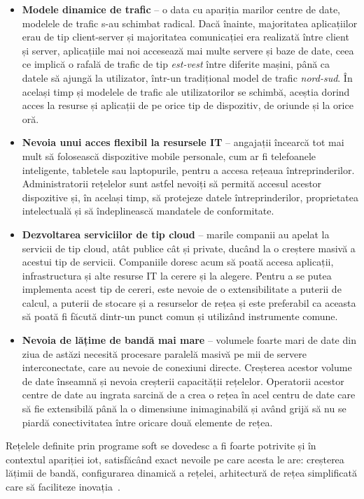 \begin{itemize}
	\item \textbf{Modele dinamice de trafic} – o data cu apariția marilor centre de date, modelele de trafic s-au schimbat radical. Dacă înainte, majoritatea aplicațiilor erau de tip client-server și majoritatea comunicației era realizată între client și server, aplicațiile mai noi accesează mai multe servere și baze de date, ceea ce implică o rafală de trafic de tip \textit{est-vest} între diferite mașini, până ca datele să ajungă la utilizator, într-un tradițional model de trafic \textit{nord-sud}. În același timp și modelele de trafic ale utilizatorilor se schimbă, aceștia dorind acces la resurse și aplicații de pe orice tip de dispozitiv, de oriunde și la orice oră.
	\item \textbf{Nevoia unui acces flexibil la resursele IT} – angajații încearcă tot mai mult să folosească dispozitive mobile personale, cum ar fi telefoanele inteligente, tabletele sau laptopurile, pentru a accesa rețeaua întreprinderilor. Administratorii rețelelor sunt astfel nevoiți să permită accesul acestor dispozitive și, în același timp, să protejeze datele întreprinderilor, proprietatea intelectuală și să îndeplinească mandatele de conformitate.
	\item \textbf{Dezvoltarea serviciilor de tip cloud} – marile companii au apelat la servicii de tip cloud, atât publice cât și private, ducând la o creștere masivă a acestui tip de servicii. Companiile doresc acum să poată accesa aplicații, infrastructura și alte resurse IT la cerere și la alegere. Pentru a se putea implementa acest tip de cereri, este nevoie de o extensibilitate a puterii de calcul, a puterii de stocare și a resurselor de rețea și este preferabil ca aceasta să poată fi făcută dintr-un punct comun și utilizând instrumente comune.
	\item \textbf{Nevoia de lățime de bandă mai mare} – volumele foarte mari de date din ziua de astăzi necesită procesare paralelă masivă pe mii de servere interconectate, care au nevoie de conexiuni directe. Creșterea acestor volume de date înseamnă și nevoia creșterii capacității rețelelor. Operatorii acestor centre de date au ingrata sarcină de a crea o rețea în acel centru de date care să fie extensibilă până la o dimensiune inimaginabilă și având grijă să nu se piardă conectivitatea între oricare două elemente de rețea.	
\end{itemize}

Rețelele definite prin programe soft se dovedesc a fi foarte potrivite și în contextul apariției \gls{iot}, satisfăcând exact nevoile pe care acesta le are: creșterea lățimii de bandă, configurarea dinamică a rețelei, arhitectură de rețea simplificată care să faciliteze inovația~\cite{qin2014software}.

